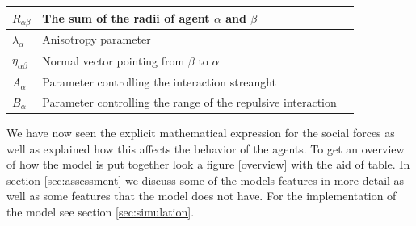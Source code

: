 \begin{center}
\begin{tabular}{lll}
\hline
$R_{\alpha\beta}$& The sum of the radii of agent $\alpha$ and $\beta$ \\
\hline
$\lambda_{\alpha}$& Anisotropy parameter &\\
\hline
$\eta_{\alpha \beta}$& Normal vector pointing from $\beta$ to $\alpha$ \\
\hline
$A_{\alpha}$& Parameter controlling the interaction streanght \\
\hline
$B_{\alpha}$& Parameter controlling the range of the repulsive interaction  \\
\hline
\end{tabular}
\end{center}

We have now seen the explicit mathematical expression for the social forces 
as well as explained how this affects the behavior of the agents. To get an 
overview of how the model is put together look a figure \ref{overview} with 
the aid of table. In section \ref{sec:assessment} 
we discuss some of the models features in more detail as well as some features 
that the model does not have. For the implementation of the model see section \ref{sec:simulation}.
